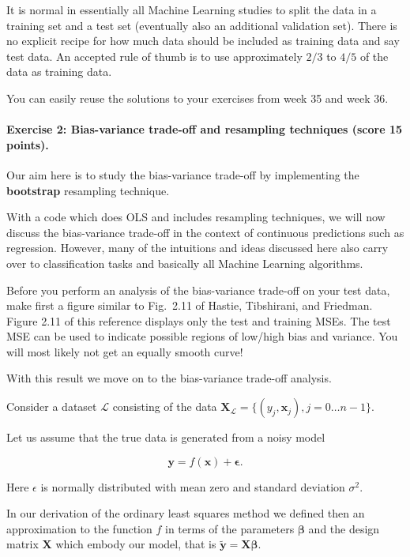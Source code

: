 \documentclass[%
oneside,                 %
final,                   %
10pt]{article}
\begin{document}
It is normal in essentially all Machine Learning studies to split the
data in a training set and a test set (eventually  also an additional
validation set).  There
is no explicit recipe for how much data should be included as training
data and say test data.  An accepted rule of thumb is to use
approximately $2/3$ to $4/5$ of the data as training data.


You can easily reuse the solutions to your exercises from week 35 and week 36.



\paragraph{Exercise 2: Bias-variance trade-off and resampling techniques (score 15 points).}
Our aim here is to study the bias-variance trade-off by implementing the \textbf{bootstrap} resampling technique.

With a code which does OLS and includes resampling techniques, 
we will now discuss the bias-variance trade-off in the context of
continuous predictions such as regression. However, many of the
intuitions and ideas discussed here also carry over to classification
tasks and basically all Machine Learning algorithms. 

Before you perform an analysis of the bias-variance trade-off on your test data, make
first a figure similar to Fig.~2.11 of Hastie, Tibshirani, and
Friedman. Figure 2.11 of this reference displays only the test and training MSEs. The test MSE can be used to 
indicate possible regions of low/high bias and variance. You will most likely not get an
equally smooth curve!

With this result we move on to the bias-variance trade-off analysis.

Consider a
dataset $\mathcal{L}$ consisting of the data
$\mathbf{X}_\mathcal{L}=\{(y_j, \boldsymbol{x}_j), j=0\ldots n-1\}$.

Let us assume that the true data is generated from a noisy model

\[
\bm{y}=f(\boldsymbol{x}) + \bm{\epsilon}.
\]

Here $\epsilon$ is normally distributed with mean zero and standard
deviation $\sigma^2$.

In our derivation of the ordinary least squares method we defined then
an approximation to the function $f$ in terms of the parameters
$\bm{\beta}$ and the design matrix $\bm{X}$ which embody our model,
that is $\bm{\tilde{y}}=\bm{X}\bm{\beta}$.
\end{document}

